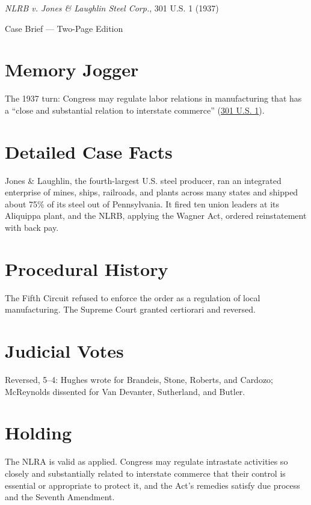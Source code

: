 \documentclass[12pt]{article}
\begin{document}
\begin{center}
{\LARGE \textit{NLRB v. Jones \& Laughlin Steel Corp.}, 301 U.S. 1 (1937)\par}
\vspace{0.5em}
{\large Case Brief --- Two-Page Edition\par}
\end{center}

\section{Memory Jogger}
The 1937 turn: Congress may regulate labor relations in manufacturing that has a ``close and substantial relation to interstate commerce'' (\href{https://supreme.justia.com/cases/federal/us/301/1/}{301 U.S. 1}).

\section{Detailed Case Facts}
Jones \& Laughlin, the fourth-largest U.S. steel producer, ran an integrated enterprise of mines, ships, railroads, and plants across many states and shipped about 75\% of its steel out of Pennsylvania. It fired ten union leaders at its Aliquippa plant, and the NLRB, applying the Wagner Act, ordered reinstatement with back pay.

\section{Procedural History}
The Fifth Circuit refused to enforce the order as a regulation of local manufacturing. The Supreme Court granted certiorari and reversed.

\section{Judicial Votes}
Reversed, 5--4: Hughes wrote for Brandeis, Stone, Roberts, and Cardozo; McReynolds dissented for Van Devanter, Sutherland, and Butler.

\section{Holding}
The NLRA is valid as applied. Congress may regulate intrastate activities so closely and substantially related to interstate commerce that their control is essential or appropriate to protect it, and the Act's remedies satisfy due process and the Seventh Amendment.
\end{document}

